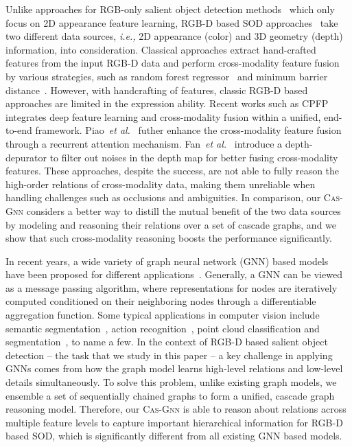 \documentclass[runningheads]{llncs}
\begin{document}
		Unlike approaches for RGB-only salient object detection methods~\cite{Yan_2019_ICCV,Feng_2019_CVPR,Liu_2019_CVPR,Wu_2019_CVPR,Zhang_2019_CVPR,Fan_2019_CVPR,luo2020webly,Fan_2018_ECCV,Fan_2019_CVPR1,Li_2018_ECCV,liu2010learning,cheng2014global,zhang2013saliency,zhang2015minimum} which only focus on 2D appearance feature learning, RGB-D based SOD approaches~\cite{Zhao_2019_CVPR,Piao_2019_ICCV,fan2019rethinking} take two different data sources, \emph{i.e.,} 2D appearance (color) and 3D geometry (depth) information, into consideration. Classical approaches extract hand-crafted features from the input RGB-D data and perform cross-modality feature fusion by various strategies, such as random forest regressor~\cite{song2017depth} and minimum barrier distance~\cite{wang2017rgb}.  However, with handcrafting of features, classic RGB-D based approaches are limited in the expression ability. Recent works such as CPFP~\cite{Zhao_2019_CVPR} integrates deep feature learning and cross-modality fusion within a unified, end-to-end framework. Piao~\emph{et al.}~\cite{Piao_2019_ICCV} futher enhance the cross-modality feature fusion through a recurrent attention mechanism.  Fan~\emph{et al.}~\cite{fan2019rethinking} introduce a depth-depurator to filter out noises in the depth map for better fusing cross-modality features. These approaches, despite the success, are not able to fully reason the high-order relations of cross-modality data, making them unreliable when handling challenges such as occlusions and ambiguities. In comparison, our {\scshape{Cas-Gnn}} considers a better way to distill the mutual benefit of the two data sources by modeling and reasoning their relations over a set of cascade graphs, and we show that such cross-modality reasoning boosts the performance significantly. 
		

		In recent years, a wide variety of graph neural network (GNN) based models~\cite{duvenaud2015convolutional,defferrard2016convolutional,scarselli2008graph,Li_2019_ICCV} have been proposed for different applications~\cite{Shen_2018_ECCV,Chen_2019_CVPR,Zhao_2019_CVPR1,Bi_2019_ICCV,luo2020hybrid}. Generally, a GNN can be viewed as a message passing algorithm, where representations for nodes are iteratively computed conditioned on their neighboring nodes through a differentiable aggregation function. Some typical applications in computer vision include semantic segmentation~\cite{Qi_2017_ICCV}, action recognition~\cite{Wang_2018_ECCV}, point cloud classification and segmentation~\cite{wang2019dynamic}, to name a few. In the context of RGB-D based salient object detection -- the task that we study in this paper -- a key challenge in applying GNNs comes from how the graph model learns high-level relations and low-level details simultaneously. To solve this problem, unlike existing graph models, we ensemble a set of sequentially chained graphs to form a unified, cascade graph reasoning model. Therefore, our {\scshape{Cas-Gnn}} is able to reason about relations across multiple feature levels to capture important hierarchical information for RGB-D based SOD, which is significantly different from all existing GNN based models.
		
\end{document}
